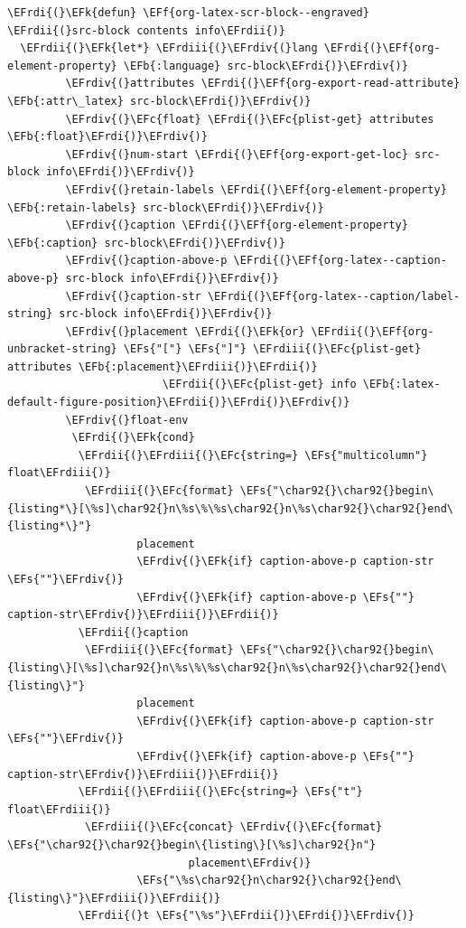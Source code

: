 \documentclass{scrartcl}
\newcommand{\EFk}[1]{\textcolor{EFk}{#1}} %
\newcommand{\EFs}[1]{\textcolor{EFs}{#1}} %
\newcommand{\EFb}[1]{\textcolor{EFb}{#1}} %
\newcommand{\EFc}[1]{\textcolor{EFc}{#1}} %
\newcommand{\EFf}[1]{\textcolor{EFf}{#1}} %
\newcommand{\EFrdi}[1]{#1} %
\newcommand{\EFrdii}[1]{#1} %
\newcommand{\EFrdiii}[1]{#1} %
\newcommand{\EFrdiv}[1]{#1} %
\begin{document}
\begin{Code}
\begin{Verbatim}[]
\EFrdi{(}\EFk{defun} \EFf{org-latex-scr-block--engraved} \EFrdii{(}src-block contents info\EFrdii{)}
  \EFrdii{(}\EFk{let*} \EFrdiii{(}\EFrdiv{(}lang \EFrdi{(}\EFf{org-element-property} \EFb{:language} src-block\EFrdi{)}\EFrdiv{)}
         \EFrdiv{(}attributes \EFrdi{(}\EFf{org-export-read-attribute} \EFb{:attr\_latex} src-block\EFrdi{)}\EFrdiv{)}
         \EFrdiv{(}\EFc{float} \EFrdi{(}\EFc{plist-get} attributes \EFb{:float}\EFrdi{)}\EFrdiv{)}
         \EFrdiv{(}num-start \EFrdi{(}\EFf{org-export-get-loc} src-block info\EFrdi{)}\EFrdiv{)}
         \EFrdiv{(}retain-labels \EFrdi{(}\EFf{org-element-property} \EFb{:retain-labels} src-block\EFrdi{)}\EFrdiv{)}
         \EFrdiv{(}caption \EFrdi{(}\EFf{org-element-property} \EFb{:caption} src-block\EFrdi{)}\EFrdiv{)}
         \EFrdiv{(}caption-above-p \EFrdi{(}\EFf{org-latex--caption-above-p} src-block info\EFrdi{)}\EFrdiv{)}
         \EFrdiv{(}caption-str \EFrdi{(}\EFf{org-latex--caption/label-string} src-block info\EFrdi{)}\EFrdiv{)}
         \EFrdiv{(}placement \EFrdi{(}\EFk{or} \EFrdii{(}\EFf{org-unbracket-string} \EFs{"["} \EFs{"]"} \EFrdiii{(}\EFc{plist-get} attributes \EFb{:placement}\EFrdiii{)}\EFrdii{)}
                        \EFrdii{(}\EFc{plist-get} info \EFb{:latex-default-figure-position}\EFrdii{)}\EFrdi{)}\EFrdiv{)}
         \EFrdiv{(}float-env
          \EFrdi{(}\EFk{cond}
           \EFrdii{(}\EFrdiii{(}\EFc{string=} \EFs{"multicolumn"} float\EFrdiii{)}
            \EFrdiii{(}\EFc{format} \EFs{"\char92{}\char92{}begin\{listing*\}[\%s]\char92{}n\%s\%\%s\char92{}n\%s\char92{}\char92{}end\{listing*\}"}
                    placement
                    \EFrdiv{(}\EFk{if} caption-above-p caption-str \EFs{""}\EFrdiv{)}
                    \EFrdiv{(}\EFk{if} caption-above-p \EFs{""} caption-str\EFrdiv{)}\EFrdiii{)}\EFrdii{)}
           \EFrdii{(}caption
            \EFrdiii{(}\EFc{format} \EFs{"\char92{}\char92{}begin\{listing\}[\%s]\char92{}n\%s\%\%s\char92{}n\%s\char92{}\char92{}end\{listing\}"}
                    placement
                    \EFrdiv{(}\EFk{if} caption-above-p caption-str \EFs{""}\EFrdiv{)}
                    \EFrdiv{(}\EFk{if} caption-above-p \EFs{""} caption-str\EFrdiv{)}\EFrdiii{)}\EFrdii{)}
           \EFrdii{(}\EFrdiii{(}\EFc{string=} \EFs{"t"} float\EFrdiii{)}
            \EFrdiii{(}\EFc{concat} \EFrdiv{(}\EFc{format} \EFs{"\char92{}\char92{}begin\{listing\}[\%s]\char92{}n"}
                            placement\EFrdiv{)}
                    \EFs{"\%s\char92{}n\char92{}\char92{}end\{listing\}"}\EFrdiii{)}\EFrdii{)}
           \EFrdii{(}t \EFs{"\%s"}\EFrdii{)}\EFrdi{)}\EFrdiv{)}

\end{Verbatim}
\end{Code}
\end{document}

